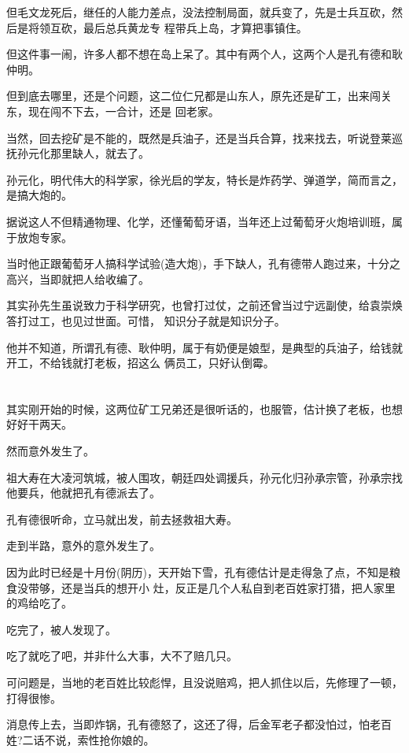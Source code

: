 \documentclass[11pt,a4paper,onecolumn]{article}
\begin{document}
但毛文龙死后，继任的人能力差点，没法控制局面，就兵变了，先是士兵互砍，然后是将领互砍，最后总兵黄龙专
程带兵上岛，才算把事镇住。

但这件事一闹，许多人都不想在岛上呆了。其中有两个人，这两个人是孔有德和耿仲明。

但到底去哪里，还是个问题，这二位仁兄都是山东人，原先还是矿工，出来闯关东，现在闯不下去，一合计，还是
回老家。

当然，回去挖矿是不能的，既然是兵油子，还是当兵合算，找来找去，听说登莱巡抚孙元化那里缺人，就去了。

孙元化，明代伟大的科学家，徐光启的学友，特长是炸药学、弹道学，简而言之，是搞大炮的。

据说这人不但精通物理、化学，还懂葡萄牙语，当年还上过葡萄牙火炮培训班，属于放炮专家。

当时他正跟葡萄牙人搞科学试验(造大炮)，手下缺人，孔有德带人跑过来，十分之高兴，当即就把人给收编了。

其实孙先生虽说致力于科学研究，也曾打过仗，之前还曾当过宁远副使，给袁崇焕答打过工，也见过世面。可惜，
知识分子就是知识分子。

他并不知道，所谓孔有德、耿仲明，属于有奶便是娘型，是典型的兵油子，给钱就开工，不给钱就打老板，招这么
俩员工，只好认倒霉。

\section[\thesection]{}

其实刚开始的时候，这两位矿工兄弟还是很听话的，也服管，估计换了老板，也想好好干两天。

然而意外发生了。

祖大寿在大凌河筑城，被人围攻，朝廷四处调援兵，孙元化归孙承宗管，孙承宗找他要兵，他就把孔有德派去了。

孔有德很听命，立马就出发，前去拯救祖大寿。

走到半路，意外的意外发生了。

因为此时已经是十月份(阴历)，天开始下雪，孔有德估计是走得急了点，不知是粮食没带够，还是当兵的想开小
灶，反正是几个人私自到老百姓家打猎，把人家里的鸡给吃了。

吃完了，被人发现了。

吃了就吃了吧，并非什么大事，大不了赔几只。

可问题是，当地的老百姓比较彪悍，且没说赔鸡，把人抓住以后，先修理了一顿，打得很惨。

消息传上去，当即炸锅，孔有德怒了，这还了得，后金军老子都没怕过，怕老百姓?二话不说，索性抢你娘的。
\end{document}
